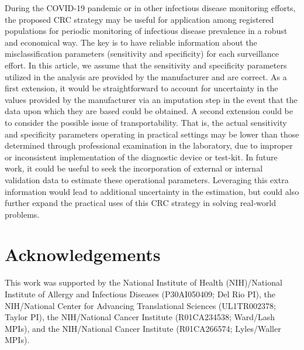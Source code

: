 \documentclass[useAMS,usenatbib,referee]{biom}
\begin{document}
During the COVID-19 pandemic or in other infectious disease monitoring efforts, the proposed CRC strategy may be useful for application among registered populations for periodic  monitoring of infectious disease prevalence in a robust and economical way. The key is to have reliable information about the misclassification parameters (sensitivity and specificity) for each surveillance effort. In this article, we assume that the sensitivity and specificity parameters utilized in the analysis are provided by the manufacturer and are correct. As a first extension, it would be straightforward to account for uncertainty in the values provided by the manufacturer via an imputation step in the event that the data upon which they are based could be obtained. A second extension could be to consider the possible issue of transportability. That is, the actual sensitivity and specificity parameters operating in practical settings may be lower than those determined through professional examination in the laboratory, due to improper or inconsistent implementation of the diagnostic device or test-kit. In future work, it could be useful to seek the incorporation of external or internal validation data to estimate these operational parameters. Leveraging this extra information would lead to additional uncertainty in the estimation, but could also further expand the practical uses of this CRC strategy in solving real-world problems.


\section*{Acknowledgements}

This work was supported by the National Institute of Health (NIH)/National Institute of Allergy and Infectious Diseases (P30AI050409; Del Rio PI), the NIH/National Center for Advancing Translational Sciences (UL1TR002378; Taylor PI), the NIH/National Cancer Institute  (R01CA234538; Ward/Lash MPIs), and the NIH/National Cancer Institute (R01CA266574; Lyles/Waller MPIs).\vspace*{-8pt}



\end{document}
